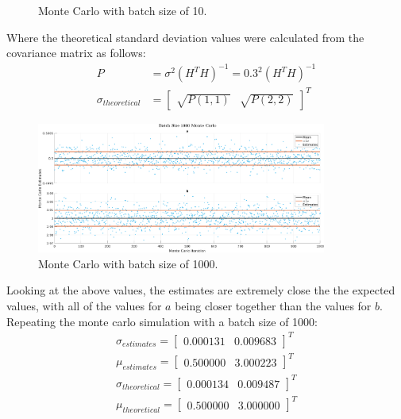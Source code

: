\documentclass[11pt]{article}
\begin{document}
\begin{enumerate}[label=\textbf{\arabic*.}]
\begin{figure}[H]
    \caption{Monte Carlo with batch size of 10.}
  \end{figure}
  Where the theoretical standard deviation values were calculated from the 
  covariance matrix as follows:
  \begin{equation*}
    \begin{split}
      P &= \sigma^2 (H^TH)^{-1} = 0.3^2 (H^TH)^{-1} \\
      \sigma_{theoretical} &= 
      \begin{bmatrix}
        \sqrt{P(1,1)} & \sqrt{P(2,2)}
      \end{bmatrix}^T
      \end{split}
  \end{equation*}
  \begin{figure}[H]
    \centering
    \includegraphics[width=0.85\textwidth]{3c.png}
    \caption{Monte Carlo with batch size of 1000.}
  \end{figure}
  Looking at the above values, the estimates are extremely close the the 
  expected values, with all of the values for $a$ being closer together than 
  the values for $b$. Repeating the monte carlo simulation with a batch size 
  of 1000:
  \begin{equation*}
    \begin{split}
      \sigma_{estimates} = \begin{bmatrix} 0.000131 & 0.009683 \end{bmatrix}^T \\
      \mu_{estimates} = \begin{bmatrix} 0.500000 & 3.000223 \end{bmatrix}^T \\
      \sigma_{theoretical} = \begin{bmatrix} 0.000134 & 0.009487 \end{bmatrix}^T \\
      \mu_{theoretical} = \begin{bmatrix} 0.500000 & 3.000000 \end{bmatrix}^T \\

\end{split}
\end{equation*}
\end{enumerate}
\end{document}
